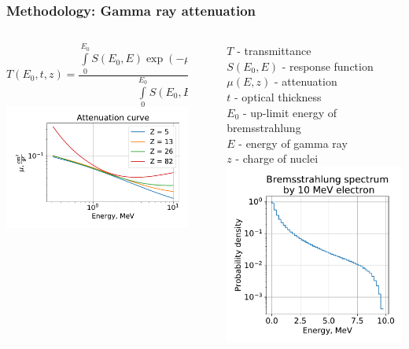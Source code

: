 \documentclass[11pt]{beamer}
\begin{document}
    \begin{frame}
    \frametitle{Methodology: Gamma ray attenuation}
    \begin{columns}
        \begin{column}{0.7\textwidth}
            $$
            T(E_0, t, z) = \frac{\int \limits_0^{E_0} S(E_0, E) \exp(-\mu(E,z)\times t)~dE)}{\int \limits_0^{E_0} S(E_0, E)~dE}
            $$
            \includegraphics[width=1\textwidth]{figures/Attenuation.pdf}
        \end{column}
    \vline~
        \begin{column}{0.4\textwidth} 
            $T$ -  transmittance\\
            $S(E_0, E)$ - response function\\
            $\mu(E,z)$ - attenuation\\
            $t$ -  optical thickness\\
            $E_0$ -  up-limit energy of bremsstrahlung\\
            $E$ - energy of gamma ray\\
            $z$ - charge of nuclei 
            \includegraphics[width=1\textwidth]{figures/Bremsstrahlung.pdf}

\end{column}
\end{columns}
\end{frame}
\end{document}
